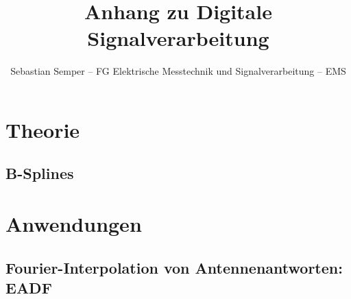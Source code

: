 \documentclass[ngerman]{article}
\title{Anhang zu Digitale Signalverarbeitung}
\author{Sebastian Semper -- FG Elektrische Messtechnik und Signalverarbeitung -- EMS}
\begin{document}


\section{Theorie}
\subsection{B-Splines}\label{b-splines}
\section{Anwendungen}
\subsection{Fourier-Interpolation von Antennenantworten: EADF}

%
%
%

\end{document}
